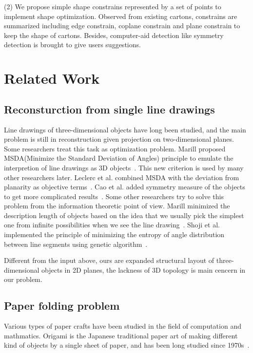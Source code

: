 \documentclass[submission]{gmp2018}
\begin{document}
(2) We propose simple shape constrains represented by a set of points to implement shape optimization. Observed from existing cartons,  constrains are summarized including edge constrain, coplane constrain and plane constrain to keep the shape of cartons. Besides, computer-aid detection like symmetry detection is brought to give users suggestions. 

\section{Related Work}\label{sec:relatedwork}
\subsection{Reconsturction from single line drawings} 
Line drawings of three-dimensional objects have long been studied, and the main problem is still in reconstruction given projection on two-dimensional planes. Some researchers treat this task as optimization problem. Marill proposed MSDA(Minimize the Standard Deviation of Angles) principle to emulate the interpretion of line drawings as 3D objects~\cite{Marill:1991:EHI:113057.113061}. This new criterion is used by many other researchers later. Leclerc et al. combined MSDA with the deviation from planarity as objective terms~\cite{Leclerc1992An}. Cao et al. added symmetry measure of the objects to get more complicated results~\cite{Cao:2005:ORS:1097114.1097658}. Some other researchers try to solve this problem from the information theoretic point of view. Marill minimized the description length of objects based on the idea that we usually pick the simplest one from infinite possibilities when we see the line drawing~\cite{Marill1992Why}. Shoji et al. implemented the principle of minimizing the entropy of angle distribution between line segments using genetic algorithm~\cite{Shoji20013}. 

Different from the input above, ours are expanded structural layout of three-dimensional objects in 2D planes, the lackness of 3D topology is main cencern in our problem.

\subsection{Paper folding problem}
Various types of paper crafts have been studied in the field of computation and mathmatics. Origami is the Japanese traditional paper art of making different kind of objects by a single sheet of paper, and has been long studied since 1970s~\cite{KANADE1980279}.
\end{document}
